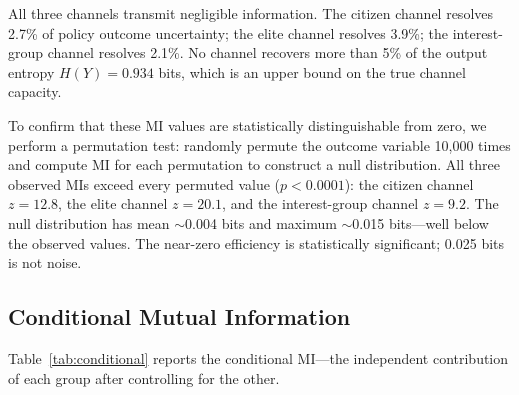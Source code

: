 \documentclass[twocolumn,10pt]{article}
\begin{document}
All three channels transmit negligible information.  The citizen channel resolves 2.7\% of policy outcome uncertainty; the elite channel resolves 3.9\%; the interest-group channel resolves 2.1\%.  No channel recovers more than 5\% of the output entropy $H(Y) = 0.934$ bits, which is an upper bound on the true channel capacity.

To confirm that these MI values are statistically distinguishable from zero, we perform a permutation test: randomly permute the outcome variable 10,000 times and compute MI for each permutation to construct a null distribution.  All three observed MIs exceed every permuted value ($p < 0.0001$): the citizen channel $z = 12.8$, the elite channel $z = 20.1$, and the interest-group channel $z = 9.2$.  The null distribution has mean $\sim$0.004 bits and maximum $\sim$0.015 bits---well below the observed values.  The near-zero efficiency is statistically significant; 0.025 bits is not noise.

\subsection{Conditional Mutual Information}

Table~\ref{tab:conditional} reports the conditional MI---the independent contribution of each group after controlling for the other.
\end{document}
